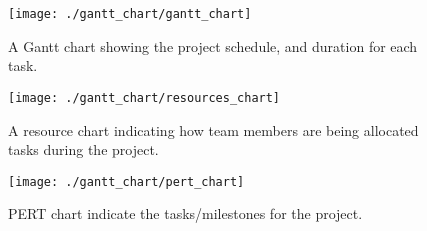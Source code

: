 \documentclass[letter,12pt]{article}
\begin{document}
%	
%		
%		
%		

\begin{landscape}
\centering
	\begin{figure}[ht]
	\begin{minipage}[b]{9.5in}
	\setlength{\unitlength}{0.2in}
	\texttt{[image: ./gantt\_chart/gantt\_chart]}
	\caption{A Gantt chart showing the project schedule, and duration for each task.}
	\label{fig:ganttchart}
	\end{minipage}

	\vspace{2in}
	
	\begin{minipage}[b]{9.5in}
	\setlength{\unitlength}{0.2in}
	\texttt{[image: ./gantt\_chart/resources\_chart]}
	\caption{A resource chart indicating how team members are being allocated tasks during the project.}
	\label{fig:resourceschart}
	\end{minipage}
	
	\end{figure}
\end{landscape}


\begin{figure}[h]
\centering 
\texttt{[image: ./gantt\_chart/pert\_chart]}
\caption{PERT chart indicate the tasks/milestones for the project.}
\label{fig:pertchart}
\end{figure}







{\linespread{1}


}
\end{document}
